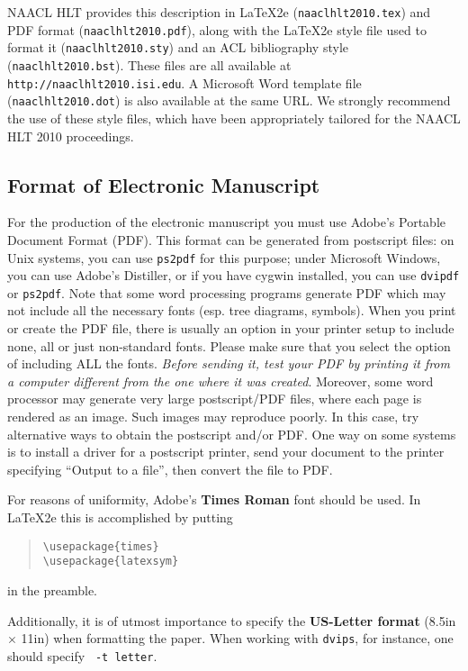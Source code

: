 \documentclass[11pt,letterpaper]{article}
\begin{document}
NAACL HLT provides this description in \LaTeX2e{} ({\tt naaclhlt2010.tex}) and PDF
format ({\tt naaclhlt2010.pdf}), along with the \LaTeX2e{} style file used to
format it ({\tt naaclhlt2010.sty}) and an ACL bibliography style ({\tt naaclhlt2010.bst}).
These files are all available at
{\tt http://naaclhlt2010.isi.edu}.  A Microsoft Word
template file ({\tt naaclhlt2010.dot}) is also available at the same URL. We
strongly recommend the use of these style files, which have been
appropriately tailored for the NAACL HLT 2010 proceedings.


\subsection{Format of Electronic Manuscript}
\label{sect:pdf}

For the production of the electronic manuscript you must use Adobe's
Portable Document Format (PDF). This format can be generated from
postscript files: on Unix systems, you can use {\tt ps2pdf} for this
purpose; under Microsoft Windows, you can use Adobe's Distiller, or
if you have cygwin installed, you can use {\tt dvipdf} or
{\tt ps2pdf}.  Note
that some word processing programs generate PDF which may not include
all the necessary fonts (esp. tree diagrams, symbols). When you print
or create the PDF file, there is usually an option in your printer
setup to include none, all or just non-standard fonts.  Please make
sure that you select the option of including ALL the fonts.  {\em
  Before sending it, test your {\/\em PDF} by printing it from a
  computer different from the one where it was created}. Moreover,
some word processor may generate very large postscript/PDF files,
where each page is rendered as an image. Such images may reproduce
poorly.  In this case, try alternative ways to obtain the postscript
and/or PDF.  One way on some systems is to install a driver for a
postscript printer, send your document to the printer specifying
``Output to a file'', then convert the file to PDF.

For reasons of uniformity, Adobe's {\bf Times Roman} font should be
used. In \LaTeX2e{} this is accomplished by putting

\begin{quote}
\begin{verbatim}
\usepackage{times}
\usepackage{latexsym}
\end{verbatim}
\end{quote}
in the preamble.

Additionally, it is of utmost importance to specify the {\bf
  US-Letter format} (8.5in $\times$ 11in) when formatting the paper.
When working with {\tt dvips}, for instance, one should specify {\tt
  -t letter}.
\end{document}
